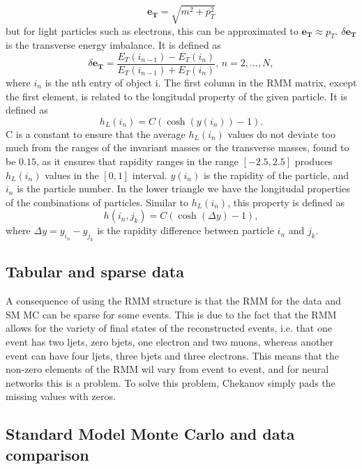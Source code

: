 \begin{equation}\label{eq:et}
    \boldsymbol{e_T} = \sqrt{m^2 + p_T^2}
\end{equation}
but for light particles such as electrons, this can be approximated to $\boldsymbol{e_T} \approx p_T$. $\delta\boldsymbol{e_T}$ 
is the transverse energy imbalance. It is defined as 
\begin{equation}\label{eq:deltaet}
    \delta\boldsymbol{e_T} = \frac{E_T(i_{n-1}) - E_T(i_n)}{E_T(i_{n-1}) + E_T(i_n)}, \, n = 2, ..., N,
\end{equation}
where $i_n$ is the nth entry of object i. The first column in the RMM matrix, except the first element, is related to the 
longitudal property of the given particle. It is defined as
\begin{equation*}
    h_L(i_n) = C(\cosh{(y(i_n))} - 1).
\end{equation*}
C is a constant to ensure that the average $h_L(i_n)$ values do not deviate too much from the ranges of the invariant masses 
or the transverse masses, found to be $0.15$, as it ensures that rapidity ranges in the range $[-2.5, 2.5]$ produces $h_L(i_n)$ values in the 
$[0,1]$ interval\cite{Chekanov_2019}. $y(i_n)$ is the rapidity of the particle, and $i_n$ is the particle number. 
In the lower triangle we have the longitudal properties of the combinations of particles. Similar to $h_L(i_n)$, this property is defined as 
\begin{equation*}
    h(i_n, j_k) = C(\cosh{(\Delta y)} - 1),
\end{equation*}
where $\Delta y = y_{i_n} - y_{j_k}$ is the rapidity difference between particle $i_n$ and $j_k$. 


\subsection*{Tabular and sparse data}
A consequence of using the RMM structure is that the RMM for the data and SM MC can be sparse for some events. This is due to the fact that the RMM allows for 
the variety of final states of the reconstructed events, i.e. that one event has two ljets, zero bjets, one electron and two muons, whereas another 
event can have four ljets, three bjets and three electrons. This means that the non-zero elements of the RMM wil vary from event to event, 
and for neural networks this is a problem. To solve this problem, Chekanov simply pads the missing values with zeros\cite{Chekanov_2019}. 

\subsection*{Standard Model Monte Carlo and data comparison}\label{sec:mcdatacomp}


